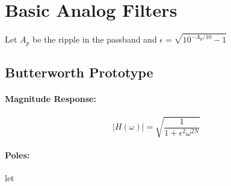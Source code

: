 \section{Basic Analog Filters}

Let $A_p$ be the ripple in the passband and $\epsilon = \sqrt{10^{-A_p/10}-1}$

\subsection{Butterworth Prototype}

\paragraph{Magnitude Response:}
\begin{equation}
 |H(\omega)| = \sqrt{ \frac{1}{1 + \epsilon^2 \omega^{2N}} }
\end{equation}

\paragraph{Poles:}
let


